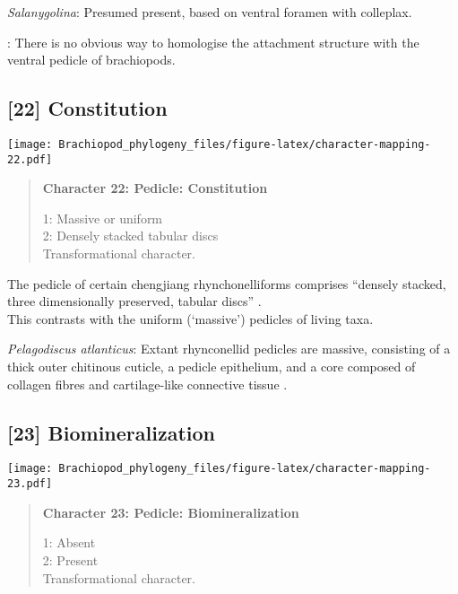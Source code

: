 \documentclass[openany]{book}
\theoremstyle{definition}
\theoremstyle{definition}
\theoremstyle{definition}
\theoremstyle{remark}
\begin{document}
\hypertarget{Salanygolina-coding-21}{}
\emph{Salanygolina}: Presumed present, based on ventral foramen with
colleplax.

\hypertarget{TAXLABELS-coding-21}{}
: There is no obvious way to homologise the attachment structure with
the ventral pedicle of brachiopods.

\subsection*{{[}22{]} Constitution}\label{constitution-1}

\texttt{[image: Brachiopod\_phylogeny\_files/figure-latex/character-mapping-22.pdf]}

\begin{quote}
\textbf{Character 22: Pedicle: Constitution}

1: Massive or uniform\\
2: Densely stacked tabular discs\\
Transformational character.
\end{quote}

The pedicle of certain chengjiang rhynchonelliforms comprises ``densely
stacked, three dimensionally preserved, tabular discs''
\citep{Holmer2018Evolutionarysignificance}.\\
This contrasts with the uniform (`massive') pedicles of living taxa.

\hypertarget{Pelagodiscus_atlanticus-coding-22}{}
\emph{Pelagodiscus atlanticus}: Extant rhynconellid pedicles are
massive, consisting of a thick outer chitinous cuticle, a pedicle
epithelium, and a core composed of collagen fibres and cartilage-like
connective tissue \citep{Holmer2018Evolutionarysignificance}.

\subsection*{{[}23{]} Biomineralization}\label{biomineralization}

\texttt{[image: Brachiopod\_phylogeny\_files/figure-latex/character-mapping-23.pdf]}

\begin{quote}
\textbf{Character 23: Pedicle: Biomineralization}

1: Absent\\
2: Present\\
Transformational character.
\end{quote}
\end{document}
